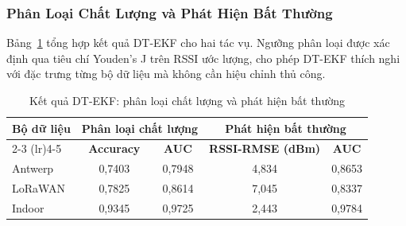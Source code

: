 \documentclass[12pt,a4paper]{article}
\begin{document}
\subsubsection{Phân Loại Chất Lượng và Phát Hiện Bất Thường}

Bảng~\ref{tab:dt_metrics} tổng hợp kết quả DT-EKF cho hai tác vụ. Ngưỡng
phân loại được xác định qua tiêu chí Youden's J trên RSSI ước lượng, cho
phép DT-EKF thích nghi với đặc trưng từng bộ dữ liệu mà không cần hiệu chỉnh
thủ công.

\begin{table}[H]
\centering
\caption{Kết quả DT-EKF: phân loại chất lượng và phát hiện bất thường}
\label{tab:dt_metrics}
\begin{tabular}{lcccc}
\toprule
\multirow{2}{*}{\textbf{Bộ dữ liệu}}
    & \multicolumn{2}{c}{\textbf{Phân loại chất lượng}}
    & \multicolumn{2}{c}{\textbf{Phát hiện bất thường}} \\
\cmidrule(lr){2-3} \cmidrule(lr){4-5}
 & \textbf{Accuracy} & \textbf{AUC} & \textbf{RSSI-RMSE (dBm)} & \textbf{AUC} \\
\midrule
Antwerp  & 0,7403 & 0,7948 & 4,834 & 0,8653 \\
LoRaWAN  & 0,7825 & 0,8614 & 7,045 & 0,8337 \\
Indoor   & 0,9345 & 0,9725 & 2,443 & 0,9784 \\
\bottomrule
\end{tabular}
\end{table}
\end{document}
